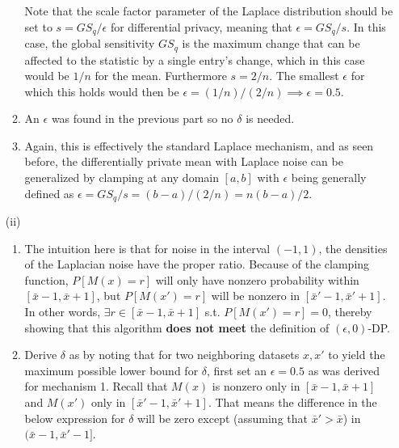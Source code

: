 \documentclass[12pt]{article}
\begin{document}
\begin{enumerate}
\begin{enumerate}
	Note that the scale factor parameter of the Laplace distribution should be set to $s = GS_q/\epsilon$ for differential privacy, meaning that $\epsilon = GS_q/s$. In this case, the global sensitivity $GS_q$ is the maximum change that can be affected to the statistic by a single entry's change, which in this case would be $1/n$ for the mean. Furthermore $s = 2 / n$. The smallest $\epsilon$ for which this holds would then be $\epsilon = (1/n) / (2/n) \implies \boxed{\epsilon= 0.5}$.
	\item An $\epsilon$ was found in the previous part so no $\delta$ is needed.
	\item Again, this is effectively the standard Laplace mechanism, and as seen before, the differentially private mean with Laplace noise can be generalized by clamping at any domain $[a, b]$ with $\epsilon$ being generally defined as $\epsilon = GS_q / s = (b- a)/(2/n)=\boxed{n(b-a)/2}$.
	\end{enumerate}
	\item[(ii)] \begin{enumerate}
	\item The intuition here is that for noise in the interval $(-1, 1)$, the densities of the Laplacian noise have the proper ratio. Because of the clamping function, $P[M(x) = r]$ will only have nonzero probability within $[\bar{x}-1,\bar{x} + 1]$, but $P[M(x') = r]$ will be nonzero in $[\bar{x}'-1,\bar{x}' + 1]$. In other words, $\exists r \in [\bar{x}-1,\bar{x} + 1]$ s.t. $P[M(x') = r] = 0$, thereby showing that this algorithm \textbf{does not meet} the definition of $(\epsilon, 0)$-DP.
	\item Derive $\delta$ as by noting that for two neighboring datasets $x, x'$ to yield the maximum possible lower bound for $\delta$, first set an $\epsilon = 0.5$ as was derived for mechanism 1. Recall that $M(x)$ is nonzero only in $[\bar{x}-1,\bar{x} + 1]$ and $M(x')$ only in $[\bar{x}'-1,\bar{x}' + 1]$. That means the difference in the below expression for $\delta$ will be zero except (assuming that $\bar{x}' > \bar{x}$) in $(\bar{x} - 1, \bar{x}' - 1]$.

\end{enumerate}
\end{enumerate}
\end{document}
